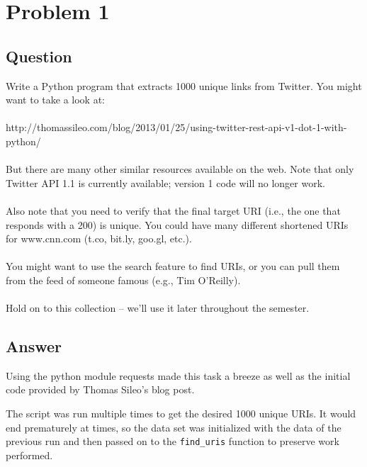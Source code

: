 \section{Problem 1}

\subsection{Question}
\vspace*{10pt}
Write a Python program that extracts 1000 unique links from
Twitter.  You might want to take a look at:\\
\\
http://thomassileo.com/blog/2013/01/25/using-twitter-rest-api-v1-dot-1-with-python/\\
\\
But there are many other similar resources available on the web.  Note
that only Twitter API 1.1 is currently available; version 1 code will
no longer work.\\
\\
Also note that you need to verify that the final target URI (i.e., the
one that responds with a 200) is unique.  You could have many different
shortened URIs for www.cnn.com (t.co, bit.ly, goo.gl, etc.).\\
\\
You might want to use the search feature to find URIs, or you can
pull them from the feed of someone famous (e.g., Tim O'Reilly).\\
\\
Hold on to this collection -- we'll use it later throughout the semester.

\subsection{Answer}
\vspace{2mm}
Using the python module requests made this task a breeze as well as the initial code provided by Thomas Sileo's blog post.
\vspace{2mm}

\vspace{1mm}
The script was run multiple times to get the desired 1000 unique URIs. It would end prematurely at times, so the data set was initialized with the data of the previous run and then passed on to the {\tt find\_uris} function to preserve work performed.
\vspace{5mm}

